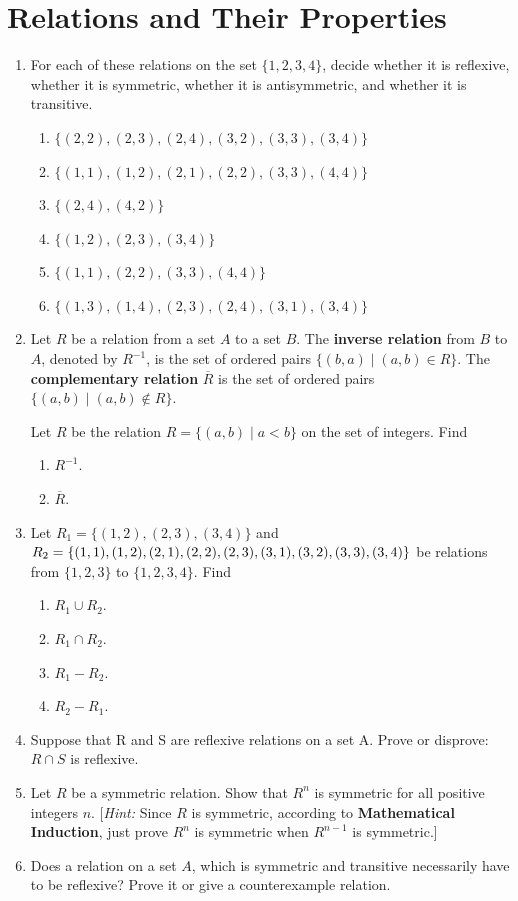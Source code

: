 \documentclass{../../cls/sig-alternate-05-2015}
\begin{document}
\section{Relations and Their Properties}
\begin{enumerate}
\item For each of these relations on the set $\{1, 2, 3, 4\}$, decide whether it is reflexive, whether it is symmetric,
whether it is antisymmetric, and whether it is transitive.
\begin{enumerate}
\item $\{(2, 2), (2, 3), (2, 4), (3, 2), (3, 3), (3, 4)\}$
\item $\{(1, 1), (1, 2), (2, 1), (2, 2), (3, 3), (4, 4)\}$
\item $\{(2, 4), (4, 2)\}$
\item $\{(1, 2), (2, 3), (3, 4)\}$
\item $\{(1, 1), (2, 2), (3, 3), (4, 4)\}$
\item $\{(1, 3), (1, 4), (2, 3), (2, 4), (3, 1), (3, 4)\}$
\end{enumerate}

\item Let $R$ be a relation from a set $A$ to a set $B$.
The \textbf{inverse relation} from $B$ to $A$,
denoted by $R^{-1}$, is the set of ordered pairs $\{(b, a) \mid (a, b) \in R\}$.
The \textbf{complementary relation} $\overline{R}$ is the set of ordered pairs $\{(a, b) \mid (a, b) \notin R\}$.

Let $R$ be the relation $R = \{(a, b) \mid a < b\}$ on the set of integers.
Find
\begin{enumerate}
	\item $R^{-1}$.
	\item $\overline{R}$.
\end{enumerate}

\item Let $R_1 = \{(1, 2), (2, 3), (3, 4)\}$ and $R_2 = \{(1, 1), (1, 2),\\
(2, 1), (2, 2), (2, 3), (3, 1), (3, 2), (3, 3), (3, 4)\}$ be relations
from $\{1, 2, 3\}$ to $\{1, 2, 3, 4\}$. Find
\begin{enumerate}
\item $R_1\cup R_2$. 
\item $R_1 \cap R_2$.
\item $R_1-R_2$. 
\item $R_2-R_1$.
\end{enumerate}
\item Suppose that R and S are reflexive relations on a set A.
Prove or disprove: $R \cap S$ is reflexive.

\item Let $R$ be a symmetric relation. Show that $R^n$ is symmetric for all positive integers $n$. [\textit{Hint:} Since $R$ is symmetric, according to \textbf{Mathematical Induction}, just prove $R^n$ is symmetric when $R^{n - 1}$ is symmetric.]

\item Does a relation on a set $A$, which is symmetric and transitive necessarily
have to be reflexive? Prove it or give a counterexample relation.
\end{enumerate}
\end{document}
